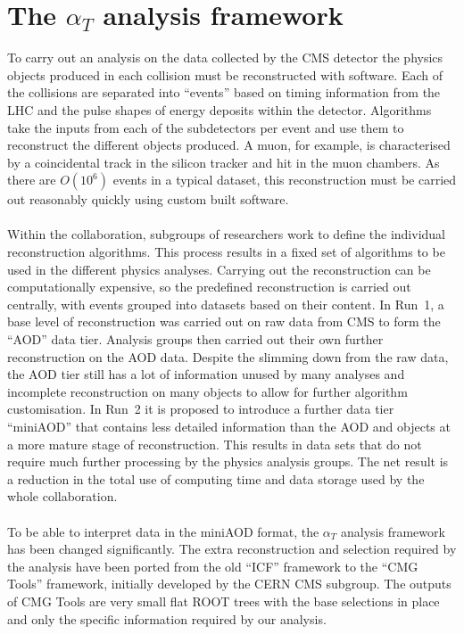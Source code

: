
\section{The \boldmath $\alpha_T$ analysis framework}
\label{sec:analysisFw}

To carry out an analysis on the data collected by the CMS detector the physics objects produced in each collision must be reconstructed with software. Each of the collisions are separated into ``events'' based on timing information from the LHC and the pulse shapes of energy deposits within the detector. Algorithms take the inputs from each of the subdetectors per event and use them to reconstruct the different objects produced. A muon, for example, is characterised by a coincidental track in the silicon tracker and hit in the muon chambers. As there are $O(10^6)$ events in a typical dataset, this reconstruction must be carried out reasonably quickly using custom built software.
\\\\
Within the collaboration, subgroups of researchers work to define the individual reconstruction algorithms. This process results in a fixed set of algorithms to be used in the different physics analyses. Carrying out the reconstruction can be computationally expensive, so the predefined reconstruction is carried out centrally, with events grouped into datasets based on their content. In Run~1, a base level of reconstruction was carried out on raw data from CMS to form the ``AOD'' data tier. Analysis groups then carried out their own further reconstruction on the AOD data. Despite the slimming down from the raw data, the AOD tier still has a lot of information unused by many analyses and incomplete reconstruction on many objects to allow for further algorithm customisation. In Run~2 it is proposed to introduce a further data tier ``miniAOD'' that contains less detailed information than the AOD and objects at a more mature stage of reconstruction. This results in data sets that do not require much further processing by the physics analysis groups. The net result is a reduction in the total use of computing time and data storage used by the whole collaboration.
\\\\
To be able to interpret data in the miniAOD format, the $\alpha_T$ analysis framework has been changed significantly. The extra reconstruction and selection required by the analysis have been ported from the old ``ICF'' framework to the ``CMG Tools'' framework, initially developed by the CERN CMS subgroup. The outputs of CMG Tools are very small flat ROOT trees with the base selections in place and only the specific information required by our analysis.
